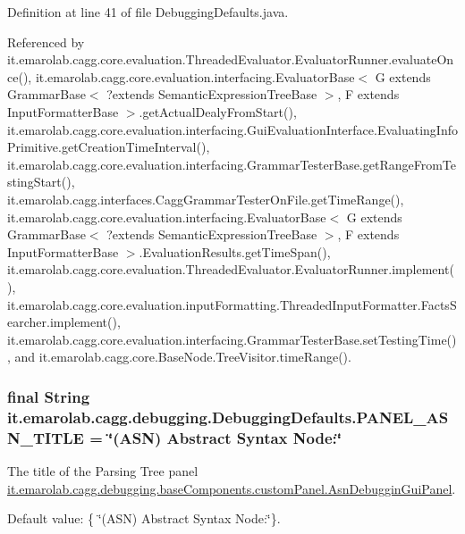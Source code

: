 Definition at line 41 of file Debugging\-Defaults.\-java.



Referenced by it.\-emarolab.\-cagg.\-core.\-evaluation.\-Threaded\-Evaluator.\-Evaluator\-Runner.\-evaluate\-Once(), it.\-emarolab.\-cagg.\-core.\-evaluation.\-interfacing.\-Evaluator\-Base$<$ G extends Grammar\-Base$<$ ?extends Semantic\-Expression\-Tree\-Base $>$, F extends Input\-Formatter\-Base $>$.\-get\-Actual\-Dealy\-From\-Start(), it.\-emarolab.\-cagg.\-core.\-evaluation.\-interfacing.\-Gui\-Evaluation\-Interface.\-Evaluating\-Info\-Primitive.\-get\-Creation\-Time\-Interval(), it.\-emarolab.\-cagg.\-core.\-evaluation.\-interfacing.\-Grammar\-Tester\-Base.\-get\-Range\-From\-Testing\-Start(), it.\-emarolab.\-cagg.\-interfaces.\-Cagg\-Grammar\-Tester\-On\-File.\-get\-Time\-Range(), it.\-emarolab.\-cagg.\-core.\-evaluation.\-interfacing.\-Evaluator\-Base$<$ G extends Grammar\-Base$<$ ?extends Semantic\-Expression\-Tree\-Base $>$, F extends Input\-Formatter\-Base $>$.\-Evaluation\-Results.\-get\-Time\-Span(), it.\-emarolab.\-cagg.\-core.\-evaluation.\-Threaded\-Evaluator.\-Evaluator\-Runner.\-implement(), it.\-emarolab.\-cagg.\-core.\-evaluation.\-input\-Formatting.\-Threaded\-Input\-Formatter.\-Facts\-Searcher.\-implement(), it.\-emarolab.\-cagg.\-core.\-evaluation.\-interfacing.\-Grammar\-Tester\-Base.\-set\-Testing\-Time(), and it.\-emarolab.\-cagg.\-core.\-Base\-Node.\-Tree\-Visitor.\-time\-Range().

\hypertarget{classit_1_1emarolab_1_1cagg_1_1debugging_1_1DebuggingDefaults_ad924bc8c8978a01904034f552874492b}{
\subsubsection[{P\-A\-N\-E\-L\-\_\-\-A\-S\-N\-\_\-\-T\-I\-T\-L\-E}]{\setlength{\rightskip}{0pt plus 5cm}final String it.\-emarolab.\-cagg.\-debugging.\-Debugging\-Defaults.\-P\-A\-N\-E\-L\-\_\-\-A\-S\-N\-\_\-\-T\-I\-T\-L\-E = \char`\"{}(A\-S\-N) Abstract Syntax Node\-:\char`\"{}\hspace{0.3cm}{\ttfamily [static]}}}\label{classit_1_1emarolab_1_1cagg_1_1debugging_1_1DebuggingDefaults_ad924bc8c8978a01904034f552874492b}
The title of the Parsing Tree panel \hyperlink{classit_1_1emarolab_1_1cagg_1_1debugging_1_1baseComponents_1_1customPanel_1_1AsnDebugginGuiPanel}{it.\-emarolab.\-cagg.\-debugging.\-base\-Components.\-custom\-Panel.\-Asn\-Debuggin\-Gui\-Panel}.\par
 Default value\-: \{ \char`\"{}(\-A\-S\-N) Abstract Syntax Node\-:\char`\"{}\}. 

